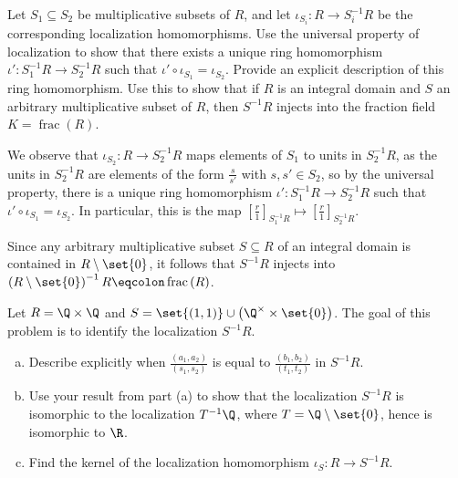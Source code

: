 \documentclass[10pt]{mypackage}
\begin{document}
\begin{problem}[Problem 4]
  Let $S_1\subseteq S_2$ be multiplicative subsets of $R$, and let $\iota_{S_i}\colon R\rightarrow S_i^{-1}R$ be the corresponding localization homomorphisms. Use the universal property of localization to show that there exists a unique ring homomorphism $\iota'\colon S_1^{-1}R\rightarrow S_2^{-1}R$ such that $\iota'\circ \iota_{S_1} = \iota_{S_2}$. Provide an explicit description of this ring homomorphism. Use this to show that if $R$ is an integral domain and $S$ an arbitrary multiplicative subset of $R$, then $S^{-1}R$ injects into the fraction field $K = \operatorname{frac}\left( R \right)$.
\end{problem}
\begin{solution}
  We observe that $\iota_{S_2}\colon R\rightarrow S_{2}^{-1}R$ maps elements of $S_1$ to units in $S_2^{-1}R$, as the units in $S_2^{-1}R$ are elements of the form $ \frac{s}{s'} $ with $s,s'\in S_2$, so by the universal property, there is a unique ring homomorphism $\iota'\colon S_1^{-1}R\rightarrow S_2^{-1}R$ such that $\iota'\circ \iota_{S_1} = \iota_{S_2}$. In particular, this is the map $ \left[ \frac{r}{1} \right]_{S_1^{-1}R} \mapsto \left[ \frac{r}{1} \right]_{S_2^{-1}R} $.\newline

  Since any arbitrary multiplicative subset $S\subseteq R$ of an integral domain is contained in $R\setminus \set{0}$, it follows that $S^{-1}R$ injects into $ \left( R\setminus \set{0} \right)^{-1}R \eqcolon \operatorname{frac}\left( R \right) $.
\end{solution}
\begin{problem}[Problem 5]
  Let $R = \Q\times \Q$ and $S = \set{\left( 1,1 \right)}\cup \left( \Q^{\times}\times \set{0} \right)$. The goal of this problem is to identify the localization $S^{-1}R$.
  \begin{enumerate}[(a)]
    \item Describe explicitly when $\frac{\left( a_1,a_2 \right)}{\left( s_1,s_2 \right)}$ is equal to $\frac{\left( b_1,b_2 \right)}{\left( t_1,t_2 \right)}$ in $S^{-1}R$.
    \item Use your result from part (a) to show that the localization $S^{-1}R$ is isomorphic to the localization $T^{-1}\Q$, where $T = \Q\setminus \set{0}$, hence is isomorphic to $\R$.
    \item Find the kernel of the localization homomorphism $\iota_S\colon R\rightarrow S^{-1}R$.
  \end{enumerate}
\end{problem}
\end{document}
